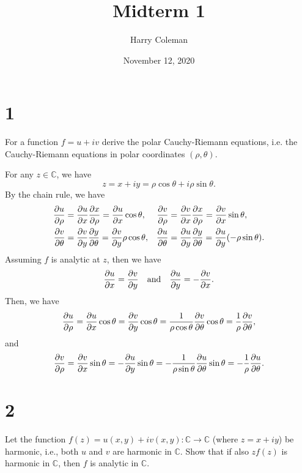 \documentclass[12pt]{article}
\newenvironment{problem}
    {\begin{lrbox}{\mybox}\begin{minipage}{0.98\textwidth}}
    {\end{minipage}\end{lrbox}\framebox[\textwidth]{\usebox{\mybox}}}
\newcommand{\isp}[1]{\quad\text{#1}\quad}
\newcommand{\C}{\mathbb{C}} %
\newcommand{\<}{\left\langle} %
\renewcommand{\>}{\right\rangle} %
\newcommand{\pdv}[3][1]{\ifnum#1=1{\frac{\partial #2}{\partial#3}}\else{\frac{\partial^{#1}#2}{\partial#3^{#1}}}\fi} %
\begin{document}
 
\title{Midterm 1\\
}
\author{Harry Coleman}
\date{November 12, 2020}
\maketitle

\section*{1}
\begin{problem}
    For a function $f = u + iv$ derive the polar Cauchy-Riemann equations, i.e. the Cauchy-Riemann equations in polar coordinates $(\rho, \theta)$.
\end{problem}
\medskip

For any $z\in\C$, we have
\[z = x+iy = \rho\cos\theta + i \rho\sin\theta.\]
By the chain rule, we have
\begin{align*}
    \pdv{u}{\rho} &= \pdv{u}{x}\pdv{x}{\rho} = \pdv{u}{x}\cos\theta, & \pdv{v}{\rho} &= \pdv{v}{x}\pdv{x}{\rho} = \pdv{v}{x}\sin\theta, \\
    \pdv{v}{\theta} &= \pdv{v}{y}\pdv{y}{\theta} = \pdv{v}{y}\rho\cos\theta, & \pdv{u}{\theta} &= \pdv{u}{y}\pdv{y}{\theta} = \pdv{u}{y}(-\rho\sin\theta).
\end{align*}
Assuming $f$ is analytic at $z$, then we have
\[\pdv{u}{x} = \pdv{v}{y} \isp{and} \pdv{u}{y} = - \pdv{v}{x}.\]
Then, we have
\[\pdv{u}{\rho} = \pdv{u}{x}\cos\theta = \pdv{v}{y}\cos\theta = \frac{1}{\rho\cos\theta}\pdv{v}{\theta}\cos\theta = \frac1\rho\pdv{v}{\theta},\]
and
\[\pdv{v}{\rho} = \pdv{v}{x}\sin\theta = -\pdv{u}{y}\sin\theta = -\frac1{\rho\sin\theta}\pdv{u}{\theta}\sin\theta = -\frac1\rho \pdv{u}{\theta}.\]

\newpage
\section*{2}
\begin{problem}
    Let the function $f(z) = u(x, y) + iv(x, y): \C \to \C$ (where $z = x + iy$) be harmonic, i.e., both $u$ and $v$ are harmonic in $\C$. Show that if also $zf(z)$ is harmonic in $\C$, then $f$ is analytic in $\C$.
\end{problem}
\end{document}
